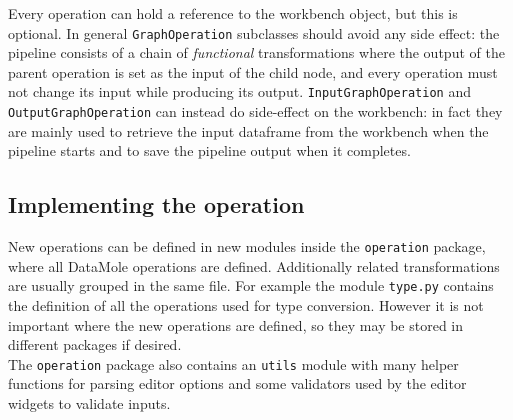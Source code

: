 Every operation can hold a reference to the workbench object, but this is optional. In general \texttt{GraphOperation} subclasses should avoid any side effect: the pipeline consists of a chain of \textit{functional} transformations where the output of the parent operation is set as the input of the child node, and every operation must not change its input while producing its output. \texttt{InputGraphOperation} and \texttt{OutputGraphOperation} can instead do side-effect on the workbench: in fact they are mainly used to retrieve the input dataframe from the workbench when the pipeline starts and to save the pipeline output when it completes.


\subsection{Implementing the operation}\label{ssec:writing-operation}
New operations can be defined in new modules inside the \texttt{operation} package, where all DataMole operations are defined. Additionally related transformations are usually grouped in the same file. For example the module \texttt{type.py} contains the definition of all the operations used for type conversion. However it is not important where the new operations are defined, so they may be stored in different packages if desired.\\
The \texttt{operation} package also contains an \texttt{utils} module with many helper functions for parsing editor options and some validators used by the editor widgets to validate inputs.\\

